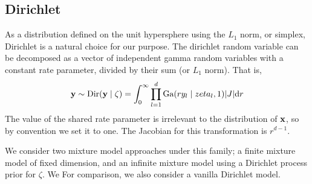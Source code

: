 \subsection{Dirichlet}
As a distribution defined on the unit hypersphere using the $L_1$ norm, or simplex, Dirichlet is a
  natural choice for our purpose.  The dirichlet random variable can be decomposed as a vector of
  independent gamma random variables with a constant rate parameter, divided by their sum
  (or $L_1$ norm). That is,
  \begin{equation}
    \label{eq:dirichletrv}
    {\bf y} \sim \text{Dir}({\bf y} \mid \zeta) =
        \int_0^{\infty}\prod_{l = 1}^d\text{Ga}(ry_l \mid zeta_l, 1)\lvert J\rvert\text{d}r
  \end{equation}
  The value of the shared rate parameter is irrelevant to the distribution of ${\bf x}$, so by
  convention we set it to one.  The Jacobian for this transformation is $r^{d-1}$. 

We consider two mixture model approaches under this family; a finite mixture model of fixed
  dimension, and an infinite mixture model using a Dirichlet process prior for $\zeta$.
  We For comparison, we also consider a vanilla Dirichlet model.

